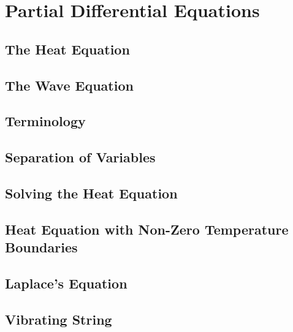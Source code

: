 \documentclass[../satmath.tex]{subfiles}
\begin{document}
\chapter{Partial Differential Equations}
\section{The Heat Equation}
\section{The Wave Equation}
\section{Terminology}
\section{Separation of Variables}
\section{Solving the Heat Equation}
\section{Heat Equation with Non-Zero Temperature Boundaries}
\section{Laplace's Equation}
\section{Vibrating String}
\end{document}
